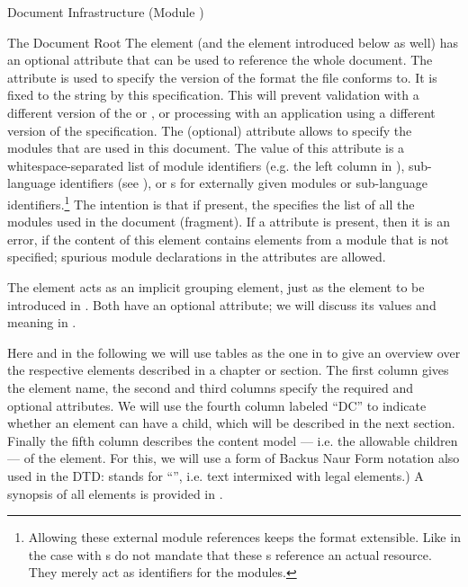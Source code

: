 \begin{tchapter}[id=omdoc-infrastructure,short=Document Infrastructure]{Document Infrastructure (Module {})}
\begin{tsection}[id=root]{The Document Root}
  The {} element (and the {} element introduced below as
  well) has an optional attribute {} that can be used to
  reference the whole document. The {} attribute is used to
  specify the version of the {\omdoc} format the file conforms to.  It is fixed to the
  string {} by this specification.  This will prevent validation with a
  different version of the {} or {}, or processing with an
  application using a different version of the {\omdoc} specification. The (optional)
  attribute {} allows to specify the {\omdoc} modules that are
  used in this document. The value of this attribute is a whitespace-separated list of
  module identifiers (e.g. {} the left column in
  {}), {\omdoc} sub-language identifiers (see
  {}), or {s} for externally given
  {\omdoc} modules or sub-language identifiers.\footnote{Allowing these external module
    references keeps the {\omdoc} format extensible. Like in the case with
    {s} {\omdoc} do not mandate that these
    {s} reference an actual resource. They merely act as
    identifiers for the modules.} The intention is that if present, the
  {} specifies the list of all the modules used in the document
  (fragment).  If a {} attribute is present, then it is an error,
  if the content of this element contains elements from a module that is not specified;
  spurious module declarations in the {} attributes are allowed.
  
  The {} element acts as an implicit grouping element, just as the
  {} element to be introduced in {}. Both have an
  optional {} attribute; we will discuss its values and meaning in
  {}.
  
  Here and in the following we will use tables as the one in {} to
  give an overview over the respective {\omdoc} elements described in a chapter or
  section.  The first column gives the element name, the second and third columns specify
  the required and optional attributes. We will use the fourth column labeled ``DC'' to
  indicate whether an {\omdoc} element can have a {} child, which will
  be described in the next section.  Finally the fifth column describes the content model
  --- i.e. the allowable children --- of the element. For this, we will use a form of
  Backus Naur Form notation also used in the DTD:
  {} stands for ``{}'', i.e. text
  intermixed with legal {\omdoc} elements.) A synopsis of all elements is provided in
  {}.


\end{tsection}
\end{tchapter}
